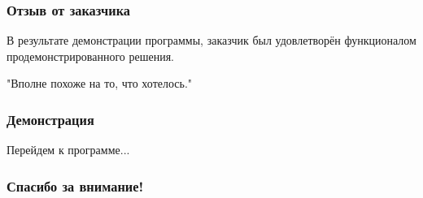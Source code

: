 \documentclass{beamer}
\begin{document}
\begin{frame}
\frametitle{Отзыв от заказчика}
В результате демонстрации программы, заказчик был удовлетворён функционалом продемонстрированного решения.

"Вполне похоже на то, что хотелось."



\end{frame}



\begin{frame}
	\frametitle{Демонстрация}
	
	Перейдем к программе...
\end{frame}


\begin{frame}[c]
\begin{center}
\frametitle{\LARGE Спасибо за внимание!}

{\LARGE \inserttitle}

\bigskip

{\insertauthor} 

\bigskip\bigskip

{\insertinstitute}

\bigskip\bigskip

{\large \insertdate}
\end{center}
\end{frame}
\end{document}
